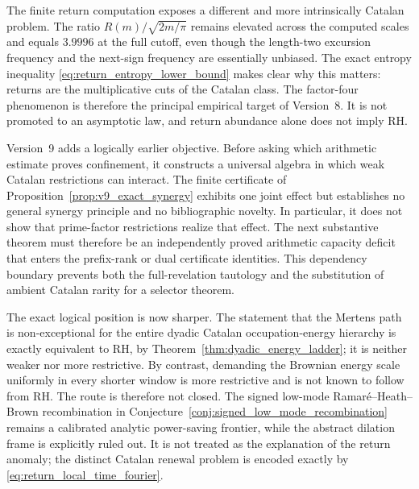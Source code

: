 \documentclass[11pt]{amsart}
\numberwithin{equation}{section}
\theoremstyle{plain}
\theoremstyle{definition}
\theoremstyle{remark}
\begin{document}
The finite return computation exposes a different and more intrinsically
Catalan problem.  The ratio $R(m)/\sqrt{2m/\pi}$ remains elevated across the
computed scales and equals $3.9996$ at the full cutoff, even though the
length-two excursion frequency and the next-sign frequency are essentially
unbiased.  The exact entropy inequality
\eqref{eq:return_entropy_lower_bound} makes clear why this matters: returns
are the multiplicative cuts of the Catalan class.  The factor-four phenomenon
is therefore the principal empirical target of Version~8.  It is not promoted
to an asymptotic law, and return abundance alone does not imply RH.

Version~9 adds a logically earlier objective.  Before asking which arithmetic
estimate proves confinement, it constructs a universal algebra in which weak
Catalan restrictions can interact.  The finite certificate of
Proposition~\ref{prop:v9_exact_synergy} exhibits one joint effect but establishes
no general synergy principle and no bibliographic novelty.  In particular, it
does not show that prime-factor restrictions realize that effect.  The next
substantive theorem must therefore be an independently
proved arithmetic capacity deficit that enters the prefix-rank or dual
certificate identities.  This dependency boundary prevents both the
full-revelation tautology and the substitution of ambient Catalan rarity for a
selector theorem.

The exact logical position is now sharper.  The statement that the Mertens
path is non-exceptional for the entire dyadic Catalan occupation-energy
hierarchy is exactly equivalent to RH, by
Theorem~\ref{thm:dyadic_energy_ladder}; it is neither weaker nor more
restrictive.  By contrast, demanding the Brownian energy scale uniformly in
every shorter window is more restrictive and is not known to follow from RH.
The route is therefore not closed.  The signed low-mode
Ramar\'e--Heath--Brown recombination in
Conjecture~\ref{conj:signed_low_mode_recombination} remains a calibrated
analytic power-saving frontier, while the abstract dilation frame is
explicitly ruled out.  It is not treated as the explanation of the return
anomaly; the distinct Catalan renewal problem is encoded exactly by
\eqref{eq:return_local_time_fourier}.
\end{document}
